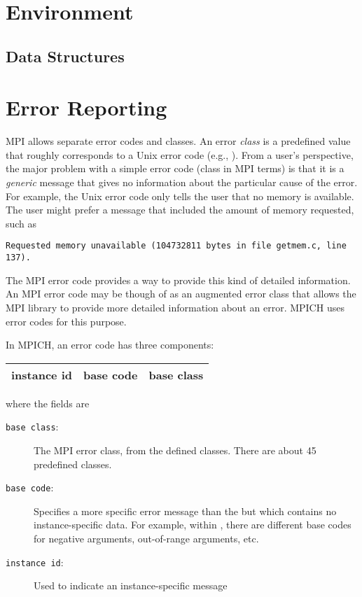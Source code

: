 \documentclass{article}
\begin{document}
\section{Environment}
\subsection{Data Structures}

%

\section{Error Reporting}
MPI allows separate error codes and classes.  An error \emph{class} is
a predefined value that roughly corresponds to a Unix error code
(e.g., ).  From a user's perspective, the major problem
with a simple error code (class in MPI terms) is that it is a
\emph{generic} message that gives no information about the particular
cause of the error.  For example, the Unix error code 
only tells the user that no memory is available.  The user might
prefer a message that included the amount of memory requested, such as 
\begin{verbatim}
Requested memory unavailable (104732811 bytes in file getmem.c, line 137).
\end{verbatim}
The MPI error code provides a way to provide this kind of detailed
information.  An MPI error code may be though of as an
augmented error class that allows the MPI library to provide more
detailed information about an error.  MPICH uses error codes for this
purpose.  

In MPICH, an error code has three components:

\begin{center}
\begin{tabular}{|c|c|c|}
\hline
instance id&base code&base class\\
\hline
\end{tabular}
\end{center}
where the fields are
\begin{description}
\item[\texttt{base class}:]The MPI error class, from the defined
classes.  There are about 45 predefined classes.

\item[\texttt{base code}:]Specifies a more specific error message than
the  but which contains no instance-specific data.
For example, within , there are different base codes
for negative arguments, out-of-range arguments, etc.

\item[\texttt{instance id}:]Used to indicate an instance-specific message
\end{description}
\end{document}
